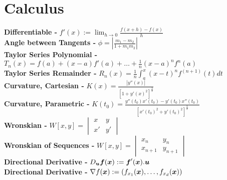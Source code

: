 \documentclass[11pt,a4paper]{article}
\begin{document}
\section*{Calculus}
\textbf{Differentiable - } $\displaystyle{f'(x) := \lim_{h \to 0} \frac{f(x + h) - f(x)}{h}}$\\
\textbf{Angle between Tangents - } $\displaystyle{\phi = \left| \frac{m_1 - m_2}{1 + m_1m_2} \right|}$\\
\textbf{Taylor Series Polynomial - } $\displaystyle{T_n(x) = f(a) + (x - a)f'(a) + \dots + \frac{1}{n}(x-a)^nf^n(a)}$\\
\textbf{Taylor Series Remainder - } $\displaystyle{R_n(x) = \frac{1}{n} \int_a^x (x-t)^nf^{(n+1)}(t) dt}$\\
\textbf{Curvature, Cartesian - } $\displaystyle{K(x) = \frac{|y''(x)|}{\left[1 + y'(x)^2\right]^{\frac{3}{2}}}}$\\
\textbf{Curvature, Parametric - } $\displaystyle{K(t_0) = \frac{y''(t_0)x'(t_0) - y'(t_0)x''(t_0)}{\left[x'(t_0)^2 + y'(t_0)^2\right]^{\frac{3}{2}}}}$\\
\textbf{Wronskian - } $W\left[x, y\right] = \begin{vmatrix} x & y \\ x' & y'\end{vmatrix}$\\
\textbf{Wronskian of Sequences - } $W\left[x, y\right] = \begin{vmatrix} x_n & y_n \\ x_{n+1} & y_{n+1}\end{vmatrix}$\\
\textbf{Directional Derivative - } $D_{\boldsymbol{u}}\boldsymbol{f}(\boldsymbol{x}) := \boldsymbol{f}'(\boldsymbol{x}).\boldsymbol{u}$\\
\textbf{Directional Derivative - } $\nabla f(\boldsymbol{x}) := (f_{x_1}(\boldsymbol{x}), \dots , f_{x_d}(\boldsymbol{x}))$
\end{document}
